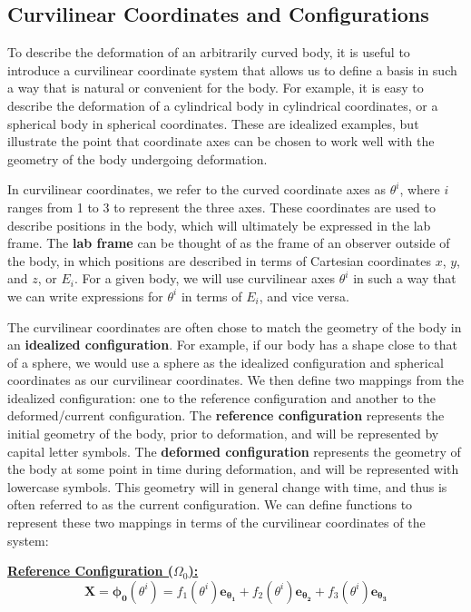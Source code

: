 \documentclass[]{spie}  %
\begin{document}
\subsection{Curvilinear Coordinates and Configurations}
To describe the deformation of an arbitrarily curved body, it is useful to introduce a curvilinear coordinate system that allows us to define a basis in such a way that is natural or convenient for the body. For example, it is easy to describe the deformation of a cylindrical body in cylindrical coordinates, or a spherical body in spherical coordinates. These are idealized examples, but illustrate the point that coordinate axes can be chosen to work well with the geometry of the body undergoing deformation. 

In curvilinear coordinates, we refer to the curved coordinate axes as $\theta^i$, where $i$ ranges from 1 to 3 to represent the three axes. These coordinates are used to describe positions in the body, which will ultimately be expressed in the lab frame. The \textbf{lab frame} can be thought of as the frame of an observer outside of the body, in which positions are described in terms of Cartesian coordinates $x$, $y$, and $z$, or $E_i$. For a given body, we will use curvilinear axes $\theta^i$ in such a way that we can write expressions for $\theta^i$ in terms of $E_i$, and vice versa. 

The curvilinear coordinates are often chose to match the geometry of the body in an \textbf{idealized configuration}. For example, if our body has a shape close to that of a sphere, we would use a sphere as the idealized configuration and spherical coordinates as our curvilinear coordinates. We then define two mappings from the idealized configuration: one to the reference configuration and another to the deformed/current configuration. The \textbf{reference configuration} represents the initial geometry of the body, prior to deformation, and will be represented by capital letter symbols. The \textbf{deformed configuration} represents the geometry of the body at some point in time during deformation, and will be represented with lowercase symbols. This geometry will in general change with time, and thus is often referred to as the current configuration. We can define functions to represent these two mappings in terms of the curvilinear coordinates of the system:

\underline{\textbf{Reference Configuration ($\Omega_0$):}}
\begin{equation}
\bm{X} = \bm{\phi_0}(\theta^i) = f_1(\theta^i)\bm{{e_{\theta_1}}} + f_2(\theta^i)\bm{{e_{\theta_2}}} + f_3(\theta^i)\bm{{e_{\theta_3}}}
\end{equation}
\end{document}
